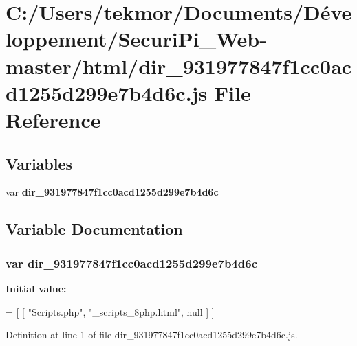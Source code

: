 \section{C\+:/\+Users/tekmor/\+Documents/\+Développement/\+Securi\+Pi\+\_\+\+Web-\/master/html/dir\+\_\+931977847f1cc0acd1255d299e7b4d6c.js File Reference}
\label{dir__931977847f1cc0acd1255d299e7b4d6c_8js}
\subsection*{Variables}
\begin{DoxyCompactItemize}
\item 
var {\bf dir\+\_\+931977847f1cc0acd1255d299e7b4d6c}
\end{DoxyCompactItemize}


\subsection{Variable Documentation}
\subsubsection[{dir\+\_\+931977847f1cc0acd1255d299e7b4d6c}]{\setlength{\rightskip}{0pt plus 5cm}var dir\+\_\+931977847f1cc0acd1255d299e7b4d6c}\label{dir__931977847f1cc0acd1255d299e7b4d6c_8js_ae1399aef37d0043e6e5222ff0338d915}
{\bfseries Initial value\+:}
\begin{DoxyCode}
=
[
    [ \textcolor{stringliteral}{"Scripts.php"}, \textcolor{stringliteral}{"\_scripts\_8php.html"}, null ]
]
\end{DoxyCode}


Definition at line 1 of file dir\+\_\+931977847f1cc0acd1255d299e7b4d6c.\+js.

